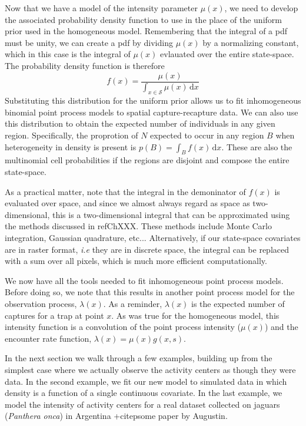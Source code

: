 Now that we have a model of the intensity parameter $\mu(x)$,
we need to develop the associated probability density function to use
in the place of the uniform prior used in the homogeneous
model. Remembering that
the integral of a pdf must be unity, we can create a pdf by dividing
$\mu(x)$ by a normalizing constant, which in this case is the integral
of $\mu(x)$ evlauated over the entire
state-space. The probability density function is therefore
\begin{equation}
f(x) = \frac{\mu(x)}{\int_{x \in \mathcal{S}} \mu(x)\, \mathrm{d}x}
\label{eq:pdf-ipp}
\end{equation}
Substituting this distribution for the
uniform prior allows us to fit inhomogeneous binomial point process
models to spatial capture-recapture data. We can also use this
distribution to obtain the expected number of individuals in any given
region. Specifically, the proprotion of $N$ expected to occur in any
region $B$ when heterogeneity in density is present is $p(B) = \int_B
f(x)\, \mathrm{d}x$. These are
also the multinomial cell probabilities if the regions are
disjoint and compose the entire state-space.

As a practical matter, note that the integral in the
demoninator of $f(x)$ is evaluated over space, and since we almost always regard as
space as two-dimensional, this is a two-dimensional integral that can
be approximated using the methods discussed in ref{ChXXX}. These methods include
Monte Carlo integration, Gaussian quadrature, etc... Alternatively, if
our state-space covariates are in raster format, \emph{i.e} they are
in discrete space, the integral can be replaced with a sum over
all pixels, which is much more efficient
computationally.

We now have all the tools needed to fit inhomogeneous point process
models. Before doing so, we note that this results in another point
process model for the 
observation process, $\lambda(x)$. As
a reminder, $\lambda(x)$ is the expected number of captures for a trap
at point $x$. As was true for the homogeneous model, this
intensity function is a convolution of the point process intensity
($\mu(x)$) and the encounter rate function,
$\lambda(x) = \mu(x) g(x,s)$.

In the next section we walk through a few examples, building up from
the simplest case where we actually observe the activity centers as
though they were data. In the second example, we fit our new model to simulated
data in which density is a function of a single continuous
covariate. In the last example, we model the intensity of activity
centers for a real dataset collected on jaguars (\emph{Panthera onca})
in Argentina +citep{some paper by Augustin}.

